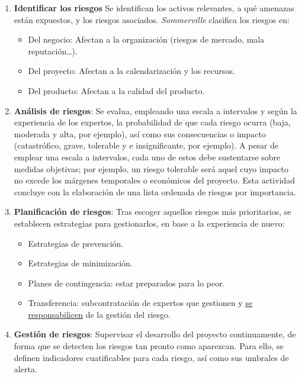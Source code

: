 \begin{enumerate}
   \item \textbf{Identificar los riesgos} Se identifican los activos relevantes, a qué amenazas están expuestos, y los riesgos asociados. \textit{Sommerville} clasifica los riesgos en:
      
      \begin{itemize}
         \item Del negocio: Afectan a la organización (riesgos de mercado, mala reputación\ldots).
         \item Del proyecto: Afectan a la calendarización y los recursos.
         \item Del producto: Afectan a la calidad del producto.
      \end{itemize}

   \item \textbf{Análisis de riesgos}: Se evalua, empleando una escala a intervalos y según la experiencia de los expertos, la probabilidad de que cada riesgo ocurra (baja, moderada y alta, por ejemplo), así como sus consecuencias o impacto (catastrófico, grave, tolerable y e insignificante, por ejemplo). A pesar de emplear una escala a intervalos, cada uno de estos debe sustentarse sobre medidas objetivas; por ejemplo, un riesgo tolerable será aquel cuyo impacto no excede los márgenes temporales o económicos del proyecto. Esta actividad concluye con la elaboración de una lista ordenada de riesgos por importancia.

   \item \textbf{Planificación de riesgos}:
         Tras escoger aquellos riesgos más prioritarios, se establecen estrategias para gestionarlos, en base a la experiencia de nuevo:
         \begin{itemize}
            \item Estrategias de prevención.
            \item Estrategias de minimización.
            \item Planes de contingencia: estar preparados para lo peor.
            \item Transferencia: subcontratación de expertos que gestionen y \uline{se responsabilicen} de la gestión del riesgo.
         \end{itemize}
   \item \textbf{Gestión de riesgos}: Supervisar el desarrollo del proyecto continuamente, de forma que se detecten los riesgos tan pronto como aparezcan. Para ello, se definen indicadores cuatificables para cada riesgo, así como sus umbrales de alerta.
\end{enumerate}

